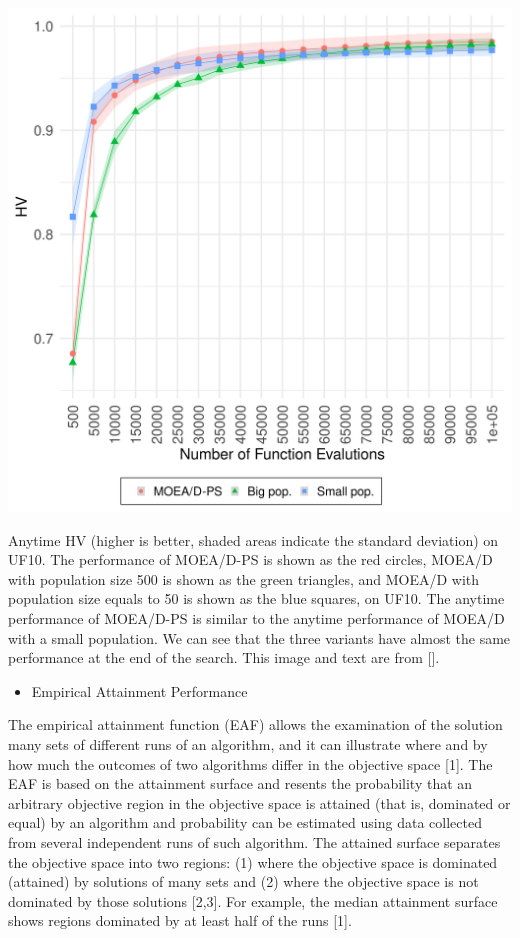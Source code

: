 \documentclass[
]{article}
\providecommand{\tightlist}{%
  \setlength{\itemsep}{0pt}\setlength{\parskip}{0pt}}
\begin{document}
\begin{center}\includegraphics[width=50in]{imgs/UF10hv_evolution} \end{center}

Anytime HV (higher is better, shaded areas indicate the standard
deviation) on UF10. The performance of MOEA/D-PS is shown as the red
circles, MOEA/D with population size 500 is shown as the green
triangles, and MOEA/D with population size equals to 50 is shown as the
blue squares, on UF10. The anytime performance of MOEA/D-PS is similar
to the anytime performance of MOEA/D with a small population. We can see
that the three variants have almost the same performance at the end of
the search. This image and text are from {[}{]}.

\begin{itemize}
\tightlist
\item
  Empirical Attainment Performance
\end{itemize}

The empirical attainment function (EAF) allows the examination of the
solution many sets of different runs of an algorithm, and it can
illustrate where and by how much the outcomes of two algorithms differ
in the objective space {[}1{]}. The EAF is based on the attainment
surface and resents the probability that an arbitrary objective region
in the objective space is attained (that is, dominated or equal) by an
algorithm and probability can be estimated using data collected from
several independent runs of such algorithm. The attained surface
separates the objective space into two regions: (1) where the objective
space is dominated (attained) by solutions of many sets and (2) where
the objective space is not dominated by those solutions {[}2,3{]}. For
example, the median attainment surface shows regions dominated by at
least half of the runs {[}1{]}.
\end{document}
